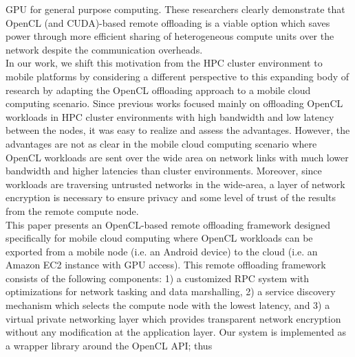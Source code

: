 \documentclass[10pt, conference, compsocconf]{IEEEtran}
\begin{document}
GPU for general purpose computing.
%
These researchers clearly demonstrate that OpenCL (and CUDA)-based
remote offloading is a viable option which saves power through more efficient
sharing of heterogeneous compute units over the network despite the
communication overheads.\\
%
\indent In our work, we shift this motivation from the HPC cluster environment
to mobile platforms by considering a different perspective to this
expanding body of research by adapting the OpenCL offloading approach to
a mobile cloud computing scenario.
%
%
%
%
%
Since previous works focused mainly on offloading OpenCL workloads in
HPC cluster environments with high bandwidth and low latency between the
nodes, it was easy to realize and assess the advantages.
%
However, the advantages are not as clear in the mobile cloud computing
scenario where OpenCL workloads are sent over the wide area on
network links with much lower bandwidth and higher latencies than 
cluster environments.
%
Moreover, since workloads are traversing untrusted networks in the
wide-area, a layer of network encryption is necessary to ensure privacy
and some level of trust of the results from the remote compute node.\\
%
\indent This paper presents an OpenCL-based remote offloading framework designed
specifically for mobile cloud computing where OpenCL workloads can be exported
from a mobile node (i.e. an Android device) to the cloud (i.e.
an Amazon EC2 instance with GPU access).
%
This remote offloading framework consists of the following components:
1) a customized RPC system with optimizations for network tasking and
data marshalling, 2) a service discovery mechanism which selects the 
compute node with the lowest latency, and 3) a virtual private networking 
layer which provides transparent network encryption without any modification 
at the application layer.
%
Our system is implemented as a wrapper library around the OpenCL API; thus
\end{document}
